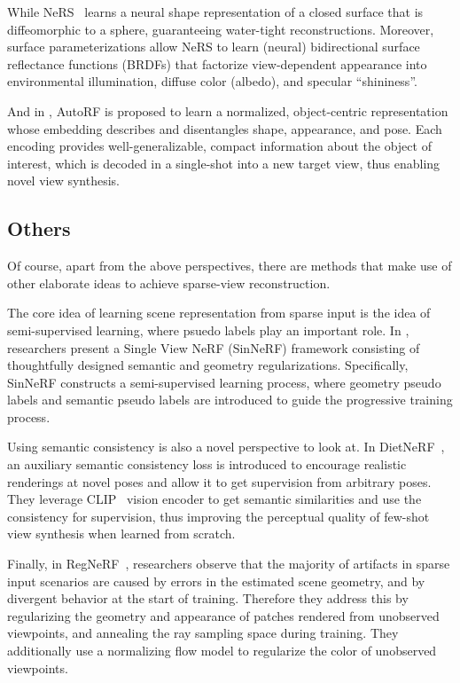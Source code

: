 \documentclass[10pt,twocolumn,letterpaper]{article}
\begin{document}
While NeRS~\cite{zhang2021ners} learns a neural shape representation of a closed surface that is diffeomorphic to a sphere, guaranteeing water-tight reconstructions. Moreover, surface parameterizations allow NeRS to learn (neural) bidirectional surface reflectance functions (BRDFs) that factorize view-dependent appearance into environmental illumination, diffuse color (albedo), and specular “shininess”.

And in \cite{mueller2022autorf}, AutoRF is proposed to learn a normalized, object-centric representation whose embedding describes and disentangles shape, appearance, and pose. Each encoding provides well-generalizable, compact information about the object of interest, which is decoded in a single-shot into a new target view, thus enabling novel view synthesis.

\subsection{Others}

Of course, apart from the above perspectives, there are methods that make use of other elaborate ideas to achieve sparse-view reconstruction.

The core idea of learning scene representation from sparse input is the idea of semi-supervised learning, where psuedo labels play an important role. 
In \cite{Xu_2022_SinNeRF}, researchers present a Single View NeRF (SinNeRF) framework consisting of thoughtfully designed semantic and geometry regularizations.
Specifically, SinNeRF constructs a semi-supervised learning process, where geometry pseudo labels and semantic pseudo labels are introduced to guide the progressive training process.

Using semantic consistency is also a novel perspective to look at. In DietNeRF~\cite{Jain_2021_ICCV}, an auxiliary semantic consistency loss is introduced to encourage realistic renderings at novel poses and allow it to get supervision from arbitrary poses. They leverage CLIP~\cite{DBLP:journals/corr/abs-2103-00020} vision encoder to get semantic similarities and use the consistency for supervision, thus improving the perceptual quality of few-shot view synthesis when learned from scratch.

Finally, in RegNeRF~\cite{Niemeyer2021Regnerf}, researchers observe that the majority of artifacts in sparse input scenarios are caused by errors in the estimated scene geometry, and by divergent behavior at the start of training. Therefore they address this by regularizing the geometry and appearance of patches rendered from unobserved viewpoints, and annealing the ray sampling space during training. They additionally use a normalizing flow model to regularize the color of unobserved viewpoints.
\end{document}
